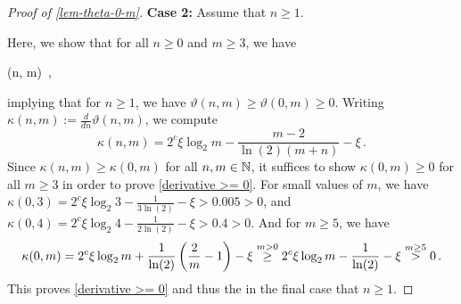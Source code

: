 \begin{proof}[Proof of \cref{lem-theta-0-m}]
  \textbf{Case 2:} Assume that $n \geq 1$.

  Here, we show that for all $n \geq 0$ and $m \geq 3$, we have
   \begin{toshowequation} \label{derivative >= 0}
     \vartheta(n, m) \,,
   \end{toshowequation}
   implying that for $n \geq 1$, we have $\vartheta(n, m) \geq \vartheta(0, m) \geq 0$.
   Writing $\kappa(n, m) := \frac{d}{dn} \vartheta(n, m)$, we compute
   \[
    \kappa(n, m) = 2^c \xi \log_2 m - \frac{m-2}{\ln (2) (m + n)} - \xi\,.
   \]
   Since $\kappa(n, m) \geq \kappa(0, m)$ for all $n, m \in \mathbb N$,
   it suffices to show $\kappa(0, m) \geq 0$ for all $m \geq 3$ in order to prove \cref{derivative >= 0}.
   For small values of $m$, we have $\kappa(0, 3) = 2^c \xi \log_2 3 - \frac{1}{3 \ln (2)} - \xi > 0.005 > 0$,
   and $\kappa(0, 4) = 2^c \xi \log_2 4 - \frac{1}{2 \ln (2)} - \xi > 0.4 > 0$.
   And for $m \geq 5$, we have
   \begin{equation*}
    \kappa(0, m) = 2^c \xi \log_2 m + \frac{1}{\ln (2)} \left({\frac{2}{m} - 1}\right) - \xi
                 \overset{m > 0}{\geq} 2^c\xi \log_2 m - \frac{1}{\ln (2)} - \xi
                 \overset{m \geq 5}{>} 0\,.
   \end{equation*}
   This proves \cref{derivative >= 0} and thus the  in the final case that $n \geq 1$.
\end{proof}

\spacingbetweenappproofs


